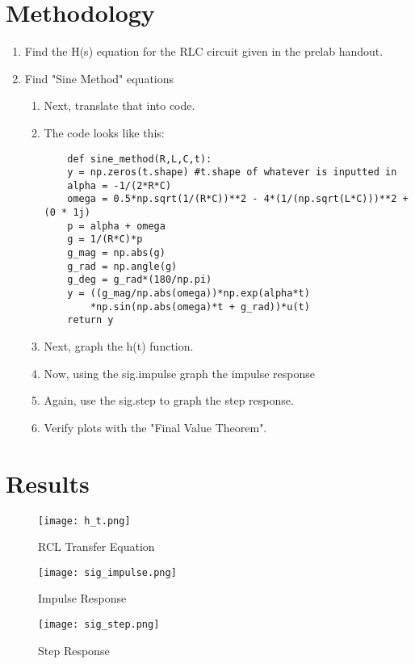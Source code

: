 \documentclass[12pt]{article}
\begin{document}
\section*{Methodology}
 \begin{enumerate}
     \item Find the H(s) equation for the RLC circuit given in the prelab handout.
     \item Find "Sine Method" equations
     \begin{enumerate}
         \item Next, translate that into code.
         \item The code looks like this:
        \\ \begin{lstlisting}
    def sine_method(R,L,C,t):
    y = np.zeros(t.shape) #t.shape of whatever is inputted in
    alpha = -1/(2*R*C)
    omega = 0.5*np.sqrt(1/(R*C))**2 - 4*(1/(np.sqrt(L*C)))**2 + (0 * 1j)
    p = alpha + omega
    g = 1/(R*C)*p
    g_mag = np.abs(g)
    g_rad = np.angle(g)
    g_deg = g_rad*(180/np.pi)
    y = ((g_mag/np.abs(omega))*np.exp(alpha*t) 
        *np.sin(np.abs(omega)*t + g_rad))*u(t)
    return y
        \end{lstlisting}
    \item Next, graph the h(t) function.
    \item Now, using the sig.impulse graph the impulse response
    \item Again, use the sig.step to graph the step response.
    \item Verify plots with the "Final Value Theorem".
     \end{enumerate}
 \end{enumerate}

\section*{Results}

\begin{figure}[H]
\caption{RCL Transfer Equation}
\centering
\texttt{[image: h\_t.png]}
\end{figure}

\begin{figure}[H]
\caption{Impulse Response}
\centering
\texttt{[image: sig\_impulse.png]}
\end{figure}

\begin{figure}[H]
\caption{Step Response}
\centering
\texttt{[image: sig\_step.png]}
\end{figure}
\end{document}
